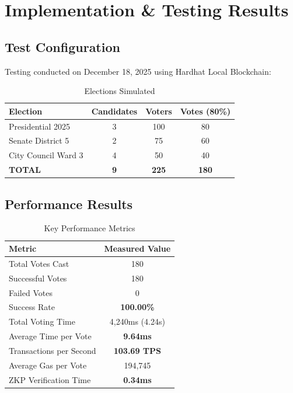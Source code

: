 \documentclass[conference]{IEEEtran}
\begin{document}
\section{Implementation \& Testing Results}

\subsection{Test Configuration}
Testing conducted on December 18, 2025 using Hardhat Local Blockchain:

\begin{table}[htbp]
\caption{Elections Simulated}
\centering
\begin{tabular}{|l|c|c|c|}
\hline
\textbf{Election} & \textbf{Candidates} & \textbf{Voters} & \textbf{Votes (80\%)} \\
\hline
Presidential 2025 & 3 & 100 & 80 \\
\hline
Senate District 5 & 2 & 75 & 60 \\
\hline
City Council Ward 3 & 4 & 50 & 40 \\
\hline
\textbf{TOTAL} & \textbf{9} & \textbf{225} & \textbf{180} \\
\hline
\end{tabular}
\end{table}

\subsection{Performance Results}

\begin{table}[htbp]
\caption{Key Performance Metrics}
\centering
\begin{tabular}{|l|c|}
\hline
\textbf{Metric} & \textbf{Measured Value} \\
\hline
Total Votes Cast & 180 \\
\hline
Successful Votes & 180 \\
\hline
Failed Votes & 0 \\
\hline
Success Rate & \textbf{100.00\%} \\
\hline
Total Voting Time & 4,240ms (4.24s) \\
\hline
Average Time per Vote & \textbf{9.64ms} \\
\hline
Transactions per Second & \textbf{103.69 TPS} \\
\hline
Average Gas per Vote & 194,745 \\
\hline
ZKP Verification Time & \textbf{0.34ms} \\
\hline
\end{tabular}
\end{table}
\end{document}
